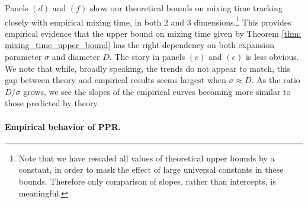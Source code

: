 \documentclass{article}
\newcommand{\1}{\mathbf{1}}
\newcommand{\ppr}{{\sc PPR}}
\theoremstyle{aldenthm}
\theoremstyle{aldenrmrk}
\begin{document}
Panels $(d)$ and $(f)$ show our theoretical bounds on mixing time tracking closely with empirical mixing time, in both 2 and 3 dimensions.\footnote{Note that we have rescaled all values of theoretical upper bounds by a constant, in order to mask the effect of large universal constants in these bounds. Therefore only comparison of slopes, rather than intercepts, is meaningful.} This provides empirical evidence that the upper bound on mixing time given by Theorem \ref{thm: mixing_time_upper_bound} has the right dependency on both expansion parameter $\sigma$ and diameter $D$. The story in panels $(c)$ and $(e)$ is less obvious. We note that while, broadly speaking, the trends do not appear to match, this gap between theory and empirical results seems largest when $\sigma \approx D$. As the ratio $D/\sigma$ grows, we see the slopes of the empirical curves becoming more similar to those predicted by theory.

\paragraph{Empirical behavior of \ppr.}
\end{document}
